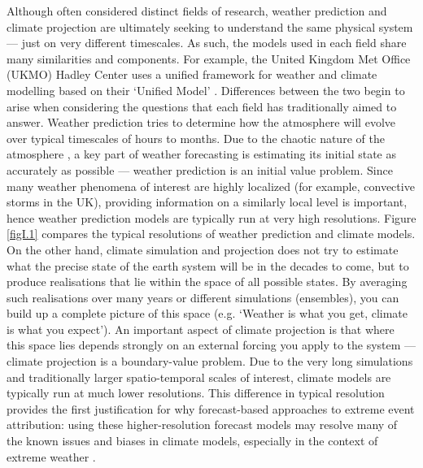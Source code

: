     Although often considered distinct fields of research, weather prediction and climate projection are ultimately seeking to understand the same physical system --- just on very different timescales. As such, the models used in each field share many similarities and components. For example, the United Kingdom Met Office (UKMO) Hadley Center uses a unified framework for weather and climate modelling based on their `Unified Model' \citep{brown_unified_2012}. Differences between the two begin to arise when considering the questions that each field has traditionally aimed to answer. Weather prediction tries to determine how the atmosphere will evolve over typical timescales of hours to months. Due to the chaotic nature of the atmosphere \citep{lorenz_deterministic_1963}, a key part of weather forecasting is estimating its initial state as accurately as possible --- weather prediction is an initial value problem. Since many weather phenomena of interest are highly localized (for example, convective storms in the UK), providing information on a similarly local level is important, hence weather prediction models are typically run at very high resolutions. Figure \ref{figI.1} compares the typical resolutions of weather prediction and climate models. On the other hand, climate simulation and projection does not try to estimate what the precise state of the earth system will be in the decades to come, but to produce realisations that lie within the space of all possible states. By averaging such realisations over many years or different simulations (ensembles), you can build up a complete picture of this space (e.g. `Weather is what you get, climate is what you expect'). An important aspect of climate projection is that where this space lies depends strongly on an external forcing you apply to the system --- climate projection is a boundary-value problem. Due to the very long simulations and traditionally larger spatio-temporal scales of interest, climate models are typically run at much lower resolutions. This difference in typical resolution provides the first justification for why forecast-based approaches to extreme event attribution: using these higher-resolution forecast models may resolve many of the known issues and biases in climate models, especially in the context of extreme weather \citep{sillmann_understanding_2017,schiemann_resolution_2017,demory_role_2014,athanasiadis_mitigating_2022}.

